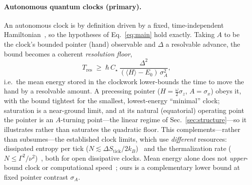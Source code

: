 \documentclass[aps,pra,twocolumn,superscriptaddress,nofootinbib,longbibliography]{revtex4-2}
\newcommand{\Ctrue}{C_{\star}}
\newcommand{\mean}[1]{\langle #1 \rangle}
\begin{document}
\paragraph{Autonomous quantum clocks (primary).}
An autonomous clock is by definition driven by a fixed, time-independent
Hamiltonian~\cite{Erker2017AutonomousClocks,Woods2021AutonomousTicking}, so the hypotheses of
Eq.~\eqref{eq:main} hold exactly. Taking $A$ to be the clock's bounded pointer (hand) observable and $\Delta$
a resolvable advance, the bound becomes a coherent \emph{resolution floor},
\begin{equation}
T_{\mathrm{res}}\;\ge\;\hbar\,\Ctrue\,\frac{\Delta^2}{(\mean{H}-E_0)\,\sigma_A^2},
\end{equation}
i.e.\ the mean energy stored in the clockwork lower-bounds the time to move the hand by a resolvable amount.
A precessing pointer ($H=\tfrac\omega2\sigma_z$, $A=\sigma_x$) obeys it, with the bound tightest for the
smallest, lowest-energy ``minimal'' clock; saturation is a near-ground limit, and at its natural (equatorial)
operating point the pointer is an $A$-turning point---the linear regime of Sec.~\ref{sec:structure}---so it
illustrates rather than saturates the quadratic floor. This complements---rather than subsumes---the
established clock limits, which use \emph{different} resources: dissipated entropy per tick
($N\lesssim\Delta S_{\mathrm{tick}}/2k_B$)~\cite{Erker2017AutonomousClocks,Pearson2021Timekeeping} and the
thermalization rate ($N\le\Gamma^2/\nu^2$)~\cite{Meier2023AccuracyResolution}, both for open dissipative
clocks. Mean energy alone does not \emph{upper}-bound clock or computational speed~\cite{Jordan2017FastComputation};
ours is a complementary lower bound at fixed pointer contrast $\sigma_A$.
\end{document}
